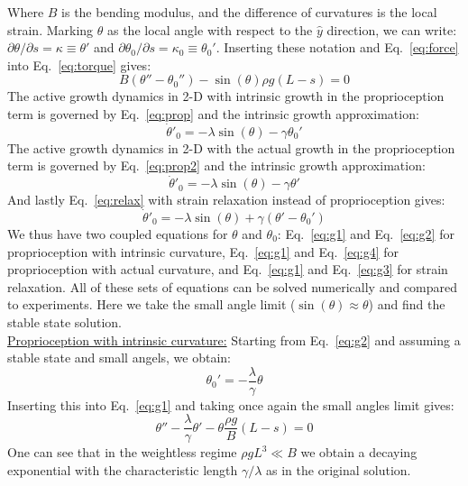 \documentclass[a4paper, 11pt]{article}
\begin{document}
Where $B$ is the bending modulus, and the difference of curvatures is the local strain. Marking $\theta$ as the local angle with respect to the $\hat{y}$ direction, we can write: $\partial\theta /\partial s=\kappa\equiv \theta '$ and $\partial\theta_0 /\partial s=\kappa_0\equiv\theta_0'$. 
Inserting these notation and Eq.~\ref{eq:force} into Eq.~\ref{eq:torque} gives:
\begin{equation}\label{eq:g1}
    B(\theta''-\theta_0'')-\sin{(\theta)}\rho g (L-s)=0
\end{equation}
The active growth dynamics in 2-D with intrinsic growth in the proprioception term is governed by Eq.~\ref{eq:prop} and the intrinsic growth approximation:
\begin{equation}\label{eq:g2}
\dot{\theta}'_0=-\lambda\sin{(\theta)}-\gamma \theta_0'
\end{equation}
The active growth dynamics in 2-D with the actual growth in the proprioception term is governed by Eq.~\ref{eq:prop2} and the intrinsic growth approximation:
\begin{equation}\label{eq:g4}
\dot{\theta}'_0=-\lambda\sin{(\theta)}-\gamma \theta'
\end{equation}
And lastly Eq.~\ref{eq:relax} with strain relaxation instead of proprioception gives:
\begin{equation}\label{eq:g3}
\dot{\theta}'_0=-\lambda\sin{(\theta)}+\gamma (\theta'-\theta_0')
\end{equation}
We thus have two coupled equations for $\theta$ and $\theta_0$: Eq.~\ref{eq:g1} and Eq.~\ref{eq:g2} for proprioception with intrinsic curvature, Eq.~\ref{eq:g1} and Eq.~\ref{eq:g4} for proprioception with actual curvature, and Eq.~\ref{eq:g1} and Eq.~\ref{eq:g3} for strain relaxation. All of these sets of equations can be solved numerically and compared to experiments. Here we take the small angle limit ($\sin{(\theta)}\approx\theta$) and find the stable state solution.\\

\noindent \underline{Proprioception with intrinsic curvature:} Starting from Eq.~\ref{eq:g2} and assuming a stable state and small angels, we obtain:
\begin{equation}
    \theta_0'=-\frac{\lambda}{\gamma}\theta
\end{equation}
Inserting this into Eq.~\ref{eq:g1} and taking once again the small angles limit gives:
\begin{equation}\label{eq:ODE1}
    \theta''-\frac{\lambda}{\gamma}\theta'-\theta\frac{\rho g}{B} (L-s)=0
\end{equation}
One can see that in the weightless regime $\rho g L^3 \ll B$ we obtain a decaying exponential with the characteristic length $\gamma/\lambda$ as in the original solution.\\
    
\end{document}
